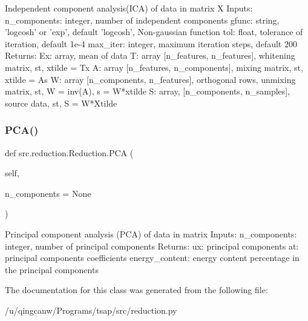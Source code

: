 \begin{DoxyVerb}Independent component analysis(ICA) of data in matrix X
Inputs:
n_components: integer, number of independent components
gfunc: string, 'logcosh' or 'exp', default 'logcosh', Non-gaussian function
tol: float, tolerance of iteration, default 1e-4
max_iter: integer, maximum iteration steps, default 200
Returns:
Ex: array, mean of data
T: array [n_features, n_features], whitening matrix, st, xtilde = Tx
A: array [n_features, n_components], mixing matrix, st, xtilde = As
W: array [n_components, n_features], orthogonal rows, unmixing matrix, st, W = inv(A), s = W*xtilde
S: array, [n_components, n_samples], source data, st, S = W*Xtilde
\end{DoxyVerb}
 \mbox{\label{classsrc_1_1reduction_1_1Reduction_ac81be4ff2c47e70a5f0af081af6faff6}} 
\subsubsection{\texorpdfstring{P\+C\+A()}{PCA()}}
{\footnotesize\ttfamily def src.\+reduction.\+Reduction.\+P\+CA (\begin{DoxyParamCaption}\item[{}]{self,  }\item[{}]{n\+\_\+components = {\ttfamily None} }\end{DoxyParamCaption})}

\begin{DoxyVerb}Principal component analysis (PCA) of data in matrix
Inputs:
n_components: integer, number of principal components
Returns:
ux: principal components
at: principal components coefficients
energy_content: energy content percentage in the principal components
\end{DoxyVerb}
 

The documentation for this class was generated from the following file\+:\begin{DoxyCompactItemize}
\item 
/u/qingcanw/\+Programs/tsap/src/reduction.\+py\end{DoxyCompactItemize}
